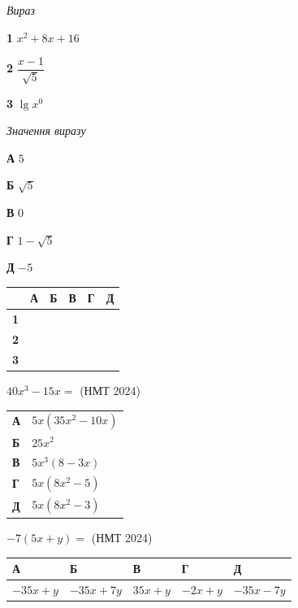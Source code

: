 \documentclass[14pt]{extarticle}
\newcommand{\answerTable}[5]{
\begin{center}
\begin{tabular}{|*{5}{>{\centering\arraybackslash}m{2.8cm}|}}
\hline
\rule[-0.3cm]{0pt}{0.8cm}\textbf{А} & \textbf{Б} & \textbf{В} & \textbf{Г} & \textbf{Д} \\
\hline
\rule[-0.4cm]{0pt}{1.0cm}#1 & \rule[-0.4cm]{0pt}{1.0cm}#2 & \rule[-0.4cm]{0pt}{1.0cm}#3 & \rule[-0.4cm]{0pt}{1.0cm}#4 & \rule[-0.4cm]{0pt}{1.0cm}#5 \\
\hline
\end{tabular}
\end{center}
}
\newcommand{\matchTable}{
\begin{tabular}{|>{\centering\arraybackslash}p{0.25cm}|*{5}{>{\centering\arraybackslash}p{0.25cm}|}}
\hline
& \scriptsize\textbf{А} & \scriptsize\textbf{Б} & \scriptsize\textbf{В} & \scriptsize\textbf{Г} & \scriptsize\textbf{Д} \\
\hline
\scriptsize\textbf{1} & \rule{0pt}{0.25cm} & & & & \\
\hline
\scriptsize\textbf{2} & \rule{0pt}{0.25cm} & & & & \\
\hline
\scriptsize\textbf{3} & \rule{0pt}{0.25cm} & & & & \\
\hline
\end{tabular}
}
\newcommand{\task}[2]{\noindent\makebox[1.5em][l]{\textbf{#1.}}\parbox[t]{\dimexpr\textwidth-1.5em}{#2}}
\newcommand{\nmtyear}[1]{\hfill{\small\color{yearcolor}(НМТ #1)}}
\begin{document}
\vspace{0.3cm}
\noindent
\begin{minipage}[t]{0.25\textwidth}
\vspace{0pt}
\textit{Вираз}

\vspace{0.2cm}
\textbf{1} \quad $x^2 + 8x + 16$

\vspace{0.3cm}
\textbf{2} \quad $\dfrac{x - 1}{\sqrt{5}}$

\vspace{0.2cm}
\textbf{3} \quad $\lg x^0$
\end{minipage}
\hfill
\begin{minipage}[t]{0.35\textwidth}
\vspace{0pt}
\textit{Значення виразу}

\vspace{0.2cm}
\textbf{А} \quad $5$

\vspace{0.2cm}
\textbf{Б} \quad $\sqrt{5}$

\vspace{0.2cm}
\textbf{В} \quad $0$

\vspace{0.2cm}
\textbf{Г} \quad $1 - \sqrt{5}$

\vspace{0.2cm}
\textbf{Д} \quad $-5$
\end{minipage}
\hfill
\begin{minipage}[t]{0.18\textwidth}
\vspace{0pt}
\matchTable
\end{minipage}

\vspace{0.7cm}

\task{18}{$40x^3 - 15x =$ \nmtyear{2024}}

\vspace{0.2cm}
\begin{tabular}{ll}
\textbf{А} & $5x(35x^2 - 10x)$ \\
\textbf{Б} & $25x^2$ \\
\textbf{В} & $5x^3(8 - 3x)$ \\
\textbf{Г} & $5x(8x^2 - 5)$ \\
\textbf{Д} & $5x(8x^2 - 3)$ \\
\end{tabular}

\vspace{0.7cm}

\task{19}{$-7(5x + y) =$ \nmtyear{2024}}
\answerTable{$-35x + y$}{$-35x + 7y$}{$35x + y$}{$-2x + y$}{$-35x - 7y$}
\end{document}

